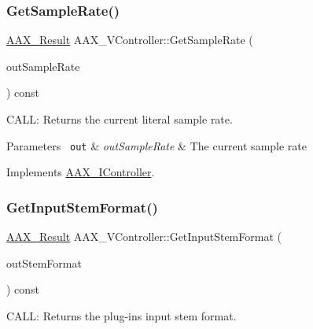 \subsubsection{\texorpdfstring{GetSampleRate()}{GetSampleRate()}}
{\footnotesize\ttfamily \mbox{\hyperlink{a00392_a4d8f69a697df7f70c3a8e9b8ee130d2f}{A\+A\+X\+\_\+\+Result}} A\+A\+X\+\_\+\+V\+Controller\+::\+Get\+Sample\+Rate (\begin{DoxyParamCaption}\item[{\mbox{\hyperlink{a00392_a3d9eea08f47e0b0a23432e15baa4e885}{A\+A\+X\+\_\+\+C\+Sample\+Rate}} $\ast$}]{out\+Sample\+Rate }\end{DoxyParamCaption}) const\hspace{0.3cm}{\ttfamily [virtual]}}



C\+A\+LL\+: Returns the current literal sample rate. 


\begin{DoxyParams}[1]{Parameters}
\mbox{\texttt{ out}}  & {\em out\+Sample\+Rate} & The current sample rate \\
\hline
\end{DoxyParams}


Implements \mbox{\hyperlink{a01789_afa1f9f64eeeab9570e5599f466fa699e}{A\+A\+X\+\_\+\+I\+Controller}}.

\mbox{\label{a01905_a58e102ae406dd0fbf022d4364e6e24d0}} 
\subsubsection{\texorpdfstring{GetInputStemFormat()}{GetInputStemFormat()}}
{\footnotesize\ttfamily \mbox{\hyperlink{a00392_a4d8f69a697df7f70c3a8e9b8ee130d2f}{A\+A\+X\+\_\+\+Result}} A\+A\+X\+\_\+\+V\+Controller\+::\+Get\+Input\+Stem\+Format (\begin{DoxyParamCaption}\item[{\mbox{\hyperlink{a00491_ad8af5ef008b2bd478add9a0acb0a1d85}{A\+A\+X\+\_\+\+E\+Stem\+Format}} $\ast$}]{out\+Stem\+Format }\end{DoxyParamCaption}) const\hspace{0.3cm}{\ttfamily [virtual]}}



C\+A\+LL\+: Returns the plug-\/in\textquotesingle{}s input stem format. 


